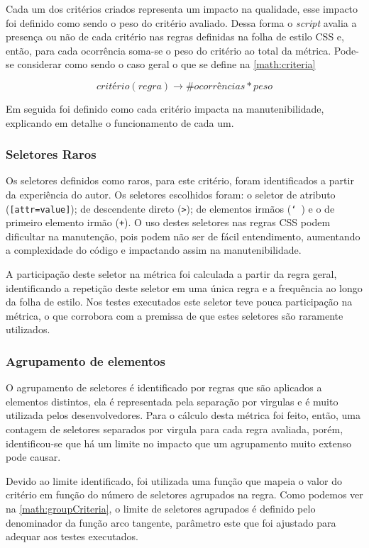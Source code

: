 Cada um dos critérios criados representa um impacto na qualidade, esse impacto foi definido como sendo o peso do critério avaliado. Dessa forma o \textit{script} avalia a presença ou não de cada critério nas regras definidas na folha de estilo CSS e, então, para cada ocorrência soma-se o peso do critério ao total da métrica. Pode-se considerar como sendo o caso geral o que se define na \autoref{math:criteria}

\begin{equation}
\label{math:criteria}
	critério(regra) \rightarrow \# ocorrências * peso
\end{equation}

Em seguida foi definido como cada critério impacta na manutenibilidade, explicando em detalhe o funcionamento de cada um.

\subsubsection{Seletores Raros}
Os seletores definidos como raros, para este critério, foram identificados a partir da experiência do autor. Os seletores escolhidos foram: o seletor de atributo (\texttt{[attr=value]}); de descendente direto (\texttt{>}); de elementos irmãos (\texttt{\char`~}) e o de primeiro elemento irmão (\texttt{+}). O uso destes seletores nas regras CSS podem dificultar na manutenção, pois podem não ser de fácil entendimento, aumentando a complexidade do código e impactando assim na manutenibilidade.

A participação deste seletor na métrica foi calculada a partir da regra geral, identificando a repetição deste seletor em uma única regra e a frequência ao longo da folha de estilo. Nos testes executados este seletor teve pouca participação na métrica, o que corrobora com a premissa de que estes seletores são raramente utilizados.

\subsubsection{Agrupamento de elementos}
O agrupamento de seletores é identificado por regras que são aplicados a elementos distintos, ela é representada pela separação por virgulas e é muito utilizada pelos desenvolvedores. Para o cálculo desta métrica foi feito, então, uma contagem de seletores separados por virgula para cada regra avaliada, porém, identificou-se que há um limite no impacto que um agrupamento muito extenso pode causar. 

Devido ao limite identificado, foi utilizada uma função que mapeia o valor do critério em função do número de seletores agrupados na regra. Como podemos ver na \autoref{math:groupCriteria}, o limite de seletores agrupados é definido pelo denominador da função arco tangente, parâmetro este que foi ajustado para adequar aos testes executados.

